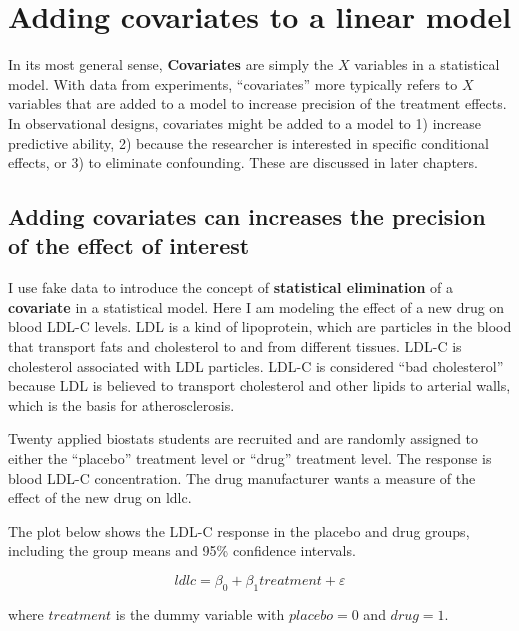 \documentclass[]{book}
\begin{document}
\chapter{Adding covariates to a linear
model}\label{adding-covariates-to-a-linear-model}

In its most general sense, \textbf{Covariates} are simply the \(X\)
variables in a statistical model. With data from experiments,
``covariates'' more typically refers to \(X\) variables that are added
to a model to increase precision of the treatment effects. In
observational designs, covariates might be added to a model to 1)
increase predictive ability, 2) because the researcher is interested in
specific conditional effects, or 3) to eliminate confounding. These are
discussed in later chapters.

\hypertarget{adding-covariates-can-increases-the-precision-of-the-effect-of-interest}{\section{Adding
covariates can increases the precision of the effect of
interest}\label{adding-covariates-can-increases-the-precision-of-the-effect-of-interest}}

I use fake data to introduce the concept of \textbf{statistical
elimination} of a \textbf{covariate} in a statistical model. Here I am
modeling the effect of a new drug on blood LDL-C levels. LDL is a kind
of lipoprotein, which are particles in the blood that transport fats and
cholesterol to and from different tissues. LDL-C is cholesterol
associated with LDL particles. LDL-C is considered ``bad cholesterol''
because LDL is believed to transport cholesterol and other lipids to
arterial walls, which is the basis for atherosclerosis.

Twenty applied biostats students are recruited and are randomly assigned
to either the ``placebo'' treatment level or ``drug'' treatment level.
The response is blood LDL-C concentration. The drug manufacturer wants a
measure of the effect of the new drug on ldlc.

The plot below shows the LDL-C response in the placebo and drug groups,
including the group means and 95\% confidence intervals.

\begin{equation}
ldlc = \beta_0 + \beta_1 treatment + \varepsilon
\label{eq:cov-no-cov}
\end{equation}

where \(treatment\) is the dummy variable with \(placebo=0\) and
\(drug=1\).
\end{document}
